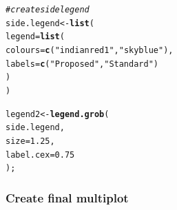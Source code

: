 \documentclass[letterpaper]{report}\usepackage[]{graphicx}\usepackage[]{color}
\makeatletter
\newcommand{\hlnum}[1]{\textcolor[rgb]{0.686,0.059,0.569}{#1}}%
\newcommand{\hlstr}[1]{\textcolor[rgb]{0.192,0.494,0.8}{#1}}%
\newcommand{\hlcom}[1]{\textcolor[rgb]{0.678,0.584,0.686}{\textit{#1}}}%
\newcommand{\hlstd}[1]{\textcolor[rgb]{0.345,0.345,0.345}{#1}}%
\newcommand{\hlkwb}[1]{\textcolor[rgb]{0.69,0.353,0.396}{#1}}%
\newcommand{\hlkwc}[1]{\textcolor[rgb]{0.333,0.667,0.333}{#1}}%
\newcommand{\hlkwd}[1]{\textcolor[rgb]{0.737,0.353,0.396}{\textbf{#1}}}%
\newenvironment{kframe}{%
 \def\at@end@of@kframe{}%
 \ifinner\ifhmode%
  \def\at@end@of@kframe{\end{minipage}}%
  \begin{minipage}{\columnwidth}%
 \fi\fi%
 \def\FrameCommand##1{\hskip\@totalleftmargin \hskip-\fboxsep
 \colorbox{shadecolor}{##1}\hskip-\fboxsep
     \hskip-\linewidth \hskip-\@totalleftmargin \hskip\columnwidth}%
 \MakeFramed {\advance\hsize-\width
   \@totalleftmargin\z@ \linewidth\hsize
   \@setminipage}}%
 {\par\unskip\endMakeFramed%
 \at@end@of@kframe}
\newenvironment{knitrout}{}{} %
\makeatother
\begin{document}
\begin{knitrout}
\begin{kframe}
\begin{alltt}
\hlcom{# create side legend}
\hlstd{side.legend} \hlkwb{<-} \hlkwd{list}\hlstd{(}
    \hlkwc{legend} \hlstd{=} \hlkwd{list}\hlstd{(}
        \hlkwc{colours} \hlstd{=} \hlkwd{c}\hlstd{(}\hlstr{"indianred1"}\hlstd{,} \hlstr{"skyblue"}\hlstd{),}
        \hlkwc{labels}  \hlstd{=} \hlkwd{c}\hlstd{(}\hlstr{"Proposed"}\hlstd{,} \hlstr{"Standard"}\hlstd{)}
        \hlstd{)}
    \hlstd{)}

\hlstd{legend2} \hlkwb{<-} \hlkwd{legend.grob}\hlstd{(}
    \hlstd{side.legend,}
    \hlkwc{size} \hlstd{=} \hlnum{1.25}\hlstd{,}
    \hlkwc{label.cex} \hlstd{=} \hlnum{0.75}
    \hlstd{);}
\end{alltt}
\end{kframe}
\end{knitrout}

\subsubsection{Create final multiplot}
\end{document}
